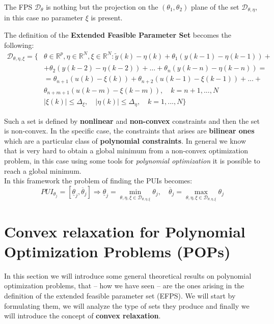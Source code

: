 \noindent
The FPS $\mathcal{D}_\theta$ is nothing but the projection on the $(\theta_1,\theta_2)$ plane of the set $\mathcal{D}_{\theta,\eta}$, in this case no parameter $\xi$ is present.

\noindent
The definition of the \textbf{Extended Feasible Parameter Set} becomes the following:
\begin{equation}
    \begin{aligned}
        \mathcal{D}_{\theta,\eta,\xi} = \{
            &\theta\in\mathbb{R}^p, \eta\in\mathbb{R}^N, \xi \in \mathbb{R}^N: 
            \tilde{y}(k)-\eta(k) + \theta_1 (y(k-1)-\eta(k-1)) +\\
            &+\theta_2 (y(k-2)-\eta(k-2))+\dots+\theta_n (y(k-n)-\eta(k-n))=\\
            &=\theta_{n+1} (u(k)-\xi(k))+\theta_{n+2} (u(k-1)-\xi(k-1)) + ...+\\
            &\theta_{n+m+1} (u(k-m)-\xi(k-m)), \quad k=n+1,...,N\\
             &\vert \xi(k) \vert \le \Delta_\xi, \quad 
            \vert \eta(k) \vert \le \Delta_\eta, \quad k=1,...,N
        \}
    \end{aligned}
\end{equation}

\noindent
Such a set is defined by \textbf{nonlinear} and \textbf{non-convex} constraints and then the set is non-convex. In the specific case, the constraints that arises are \textbf{bilinear ones} which are a particular class of \textbf{polynomial constraints}. In general we know that is very hard to obtain a global minimum from a non-convex optimization problem, in this case using some tools for \textit{polynomial optimization} it is possible to reach a global minimum.\\

\noindent
In this framework the problem of finding the PUIs becomes:
{\large{
    \begin{equation}\label{eq:PUI_delta}
        PUI_{\theta_j} = [\underline{\theta}_j,\overline{\theta}_j] \Longrightarrow 
        \underline{\theta}_j = \min_{{\theta,\eta,\xi}\in\mathcal{D}_{\theta,\eta,\xi} } \theta_j,    \quad
        \overline{\theta}_j = \max_{{\theta,\eta,\xi}\in\mathcal{D}_{\theta,\eta,\xi}} \theta_j
    \end{equation}
}}

\section{Convex relaxation for Polynomial Optimization Problems (POPs)}
\begin{center}
    \textsf{
    In this section we will introduce some general theoretical results on polynomial optimization problems, that -- how we have seen -- are the ones arising in the definition of the extended feasible parameter set (EFPS). We will start by formulating them, we will analyze the type of sets they produce and finally we will introduce the concept of \textbf{convex relaxation}.}
\end{center}


